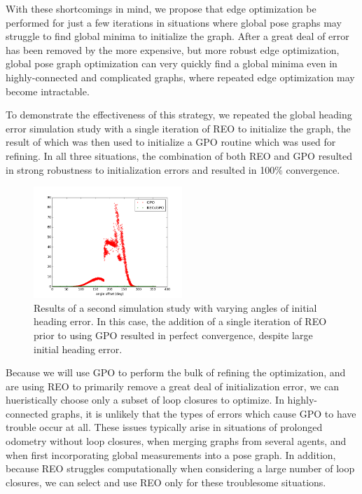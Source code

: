 With these shortcomings in mind, we propose that edge optimization be performed for just a few iterations in situations where global pose graphs may struggle to find global minima to initialize the graph.  After a great deal of error has been removed by the more expensive, but more robust edge optimization, global pose graph optimization can very quickly find a global minima even in highly-connected and complicated graphs, where repeated edge optimization may become intractable.

To demonstrate the effectiveness of this strategy, we repeated the global heading error simulation study with a single iteration of REO to initialize the graph, the result of which was then used to initialize a GPO routine which was used for refining.  In all three situations, the combination of both REO and GPO resulted in strong robustness to initialization errors and resulted in 100\% convergence.

\begin{figure}[H]
  \includegraphics[width=0.5\textwidth]{figures/combined_global_heading_results.png}
  \caption{Results of a second simulation study with varying angles of initial heading error.  In this case, the addition of a single iteration of REO prior to using GPO resulted in perfect convergence, despite large initial heading error.}
  \label{fig:combined_global_heading_results}
\end{figure}

Because we will use GPO to perform the bulk of refining the optimization, and are using REO to primarily remove a great deal of initialization error, we can hueristically choose only a subset of loop closures to optimize.  In highly-connected graphs, it is unlikely that the types of errors which cause GPO to have trouble occur at all.  These issues typically arise in situations of prolonged odometry without loop closures, when merging graphs from several agents, and when first incorporating global measurements into a pose graph.  In addition, because REO struggles computationally when considering a large number of loop closures, we can select and use REO only for these troublesome situations.

